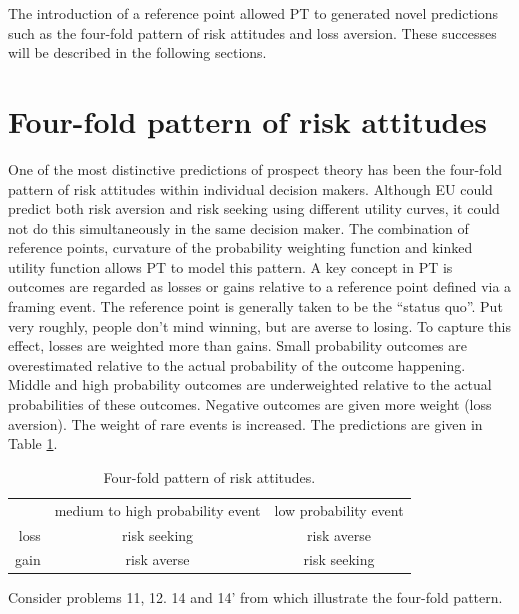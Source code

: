 \documentclass{article}\usepackage[]{graphicx}\usepackage[]{color}
\begin{document}
The introduction of a reference point allowed PT to generated novel predictions such as the four-fold pattern of risk attitudes and loss aversion. These successes will be described in the following sections.

\section{Four-fold pattern of risk attitudes}

One of the most distinctive predictions of prospect theory has been the four-fold pattern of risk attitudes within
individual decision makers. Although EU could predict both risk aversion and risk seeking using different utility curves, it could not do this simultaneously in the same decision maker.
The combination of reference points, curvature of the probability weighting function and kinked utility function allows PT to model this pattern.
A key concept in PT is outcomes are regarded as losses or gains relative to a reference point defined via a framing event.
The reference point is generally taken to be the ``status quo''.
Put very roughly, people don't mind winning, but are averse to losing. To capture this effect, losses are weighted more than gains. Small probability outcomes are overestimated relative to the actual probability of the outcome happening.
Middle and high probability outcomes are underweighted relative to the actual probabilities of these outcomes.
Negative outcomes are given more weight (loss aversion). The weight of rare events is increased.
The predictions are given in Table \ref{four_fold_table}.

\begin{table}[h]
\caption{Four-fold pattern of risk attitudes.}
\centering
\begin{tabular}{ r|c|c| }
\multicolumn{1}{r}{}
 &  \multicolumn{1}{c}{medium to high probability event}
 & \multicolumn{1}{c}{low probability event} \\
\cline{2-3}
loss & risk seeking & risk averse \\
\cline{2-3}
gain & risk averse & risk seeking \\
\cline{2-3}
\end{tabular}
\label{four_fold_table}
\end{table}

Consider problems 11, 12. 14 and 14' from \citet[][p. 273, 281]{Kahneman_Tversky_1979} which illustrate the four-fold pattern.
\end{document}
